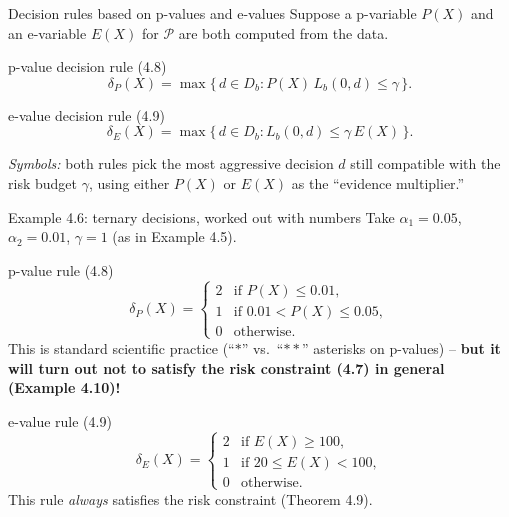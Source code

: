 \documentclass[aspectratio=169,10pt]{beamer}
\begin{document}
\begin{frame}{Decision rules based on p-values and e-values}
  Suppose a p-variable $P(X)$ and an e-variable $E(X)$ for $\mathcal P$ are
  both computed from the data.
  \begin{block}{p-value decision rule (4.8)}
    \[
      \delta_P(X) = \max\{\,d\in D_b : P(X)\,L_b(0,d)\le\gamma\,\}.
    \]
  \end{block}
  \begin{block}{e-value decision rule (4.9)}
    \[
      \delta_E(X) = \max\{\,d\in D_b : L_b(0,d)\le\gamma\,E(X)\,\}.
    \]
  \end{block}
  \emph{Symbols:} both rules pick the most aggressive decision $d$ still
  compatible with the risk budget $\gamma$, using either $P(X)$ or $E(X)$ as
  the ``evidence multiplier.''
\end{frame}

\begin{frame}{Example 4.6: ternary decisions, worked out with numbers}
  Take $\alpha_1=0.05$, $\alpha_2=0.01$, $\gamma=1$ (as in Example 4.5).
  \begin{block}{p-value rule (4.8)}
    \[
      \delta_P(X) =
      \begin{cases}
        2 & \text{if } P(X)\le 0.01,\\
        1 & \text{if } 0.01 < P(X) \le 0.05,\\
        0 & \text{otherwise.}
      \end{cases}
    \]
    This is standard scientific practice (``$*$'' vs.\ ``$**$'' asterisks on
    p-values) -- \textbf{but it will turn out not to satisfy the risk
    constraint (4.7) in general (Example 4.10)!}
  \end{block}
  \begin{block}{e-value rule (4.9)}
    \[
      \delta_E(X) =
      \begin{cases}
        2 & \text{if } E(X)\ge 100,\\
        1 & \text{if } 20\le E(X) < 100,\\
        0 & \text{otherwise.}
      \end{cases}
    \]
    This rule \emph{always} satisfies the risk constraint (Theorem 4.9).
  \end{block}
\end{frame}
\end{document}
